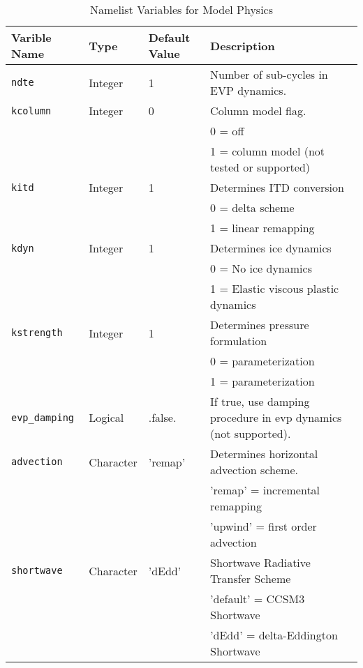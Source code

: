 \begin{table}
  \begin{center}
  \caption{Namelist Variables for Model Physics}
  \label{ice_nml}
  \begin{tabular}{p{3cm}p{2.0cm}p{3cm}p{6.5cm}} \hline
  Varible Name & Type & Default Value & Description               \\
\hline \hline

{\tt ndte} & Integer & 1 & Number of sub-cycles in EVP dynamics. \\

{\tt kcolumn} &  Integer & 0 & Column model flag. \\
        &          &   & 0 = off \\
        &          &   & 1 = column model (not tested or supported)\\

{\tt kitd} &  Integer & 1 & Determines ITD conversion \\
     &          &   & 0 = delta scheme \\
     &          &   & 1 = linear remapping \\

{\tt kdyn} &  Integer & 1 & Determines ice dynamics \\
     &          &   & 0 = No ice dynamics\\
     &          &   & 1 = Elastic viscous plastic dynamics\\

{\tt kstrength} &  Integer & 1 &  Determines pressure formulation \\
          &          &   &  0 = \cite{hibl79} parameterization \\
          &          &   &  1 = \cite{roth75b} parameterization \\

{\tt evp\_damping} &  Logical & .false. & If true, use damping procedure
                                             in evp dynamics (not supported). \\

{\tt advection} &  Character & 'remap' &  Determines horizontal
                                               advection scheme. \\
          &            &   &  'remap' = incremental remapping \\
          &            &   &   'upwind' = first order advection \\

{\tt shortwave} & Character & 'dEdd' & Shortwave Radiative Transfer Scheme \\
                &           &        & 'default' = CCSM3 Shortwave \\
                &           &        & 'dEdd' = delta-Eddington Shortwave \\


\end{tabular}
\end{center}
\end{table}
